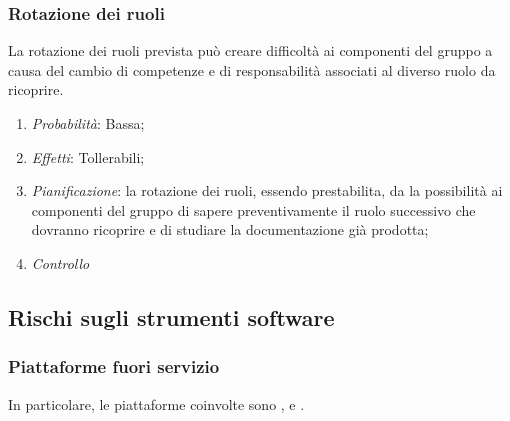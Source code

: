 		\subsubsection{Rotazione dei ruoli}

La rotazione dei ruoli prevista può creare difficoltà ai componenti del gruppo a causa del cambio di competenze e di responsabilità associati al diverso ruolo da ricoprire.

\begin{enumerate}
\item \textit{Probabilità}: Bassa;
\item \textit{Effetti}: Tollerabili;
\item \textit{Pianificazione}: la rotazione dei ruoli, essendo prestabilita, da la possibilità ai componenti del gruppo di sapere preventivamente il ruolo successivo che dovranno ricoprire e di studiare la documentazione già prodotta;
\item \textit{Controllo} %
\end{enumerate}
	
	\subsection{Rischi sugli strumenti software}
	
		\subsubsection{Piattaforme fuori servizio}	

In particolare, le piattaforme coinvolte sono ,  e . 

